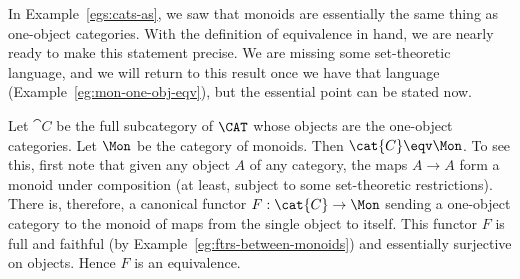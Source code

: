 \begin{example}
\label{eg:equivs-mon}
In Example~\ref{egs:cats-as}, we saw that monoids
are essentially the same thing as one-object%
%
%
categories.  With the definition of equivalence in hand, we are nearly
ready to make this statement precise.  We are missing some set-theoretic
language, and we will return to this result once we have that language
(Example~\ref{eg:mon-one-obj-eqv}), but the essential point can be stated
now.

Let $\cat{C}$ be the full subcategory of $\CAT$ whose objects are the
one-object categories.  Let $\Mon$ be the category of monoids.  Then
$\cat{C} \eqv \Mon$.  To see this, first note that given any object $A$ of
any category, the maps $A \to A$ form a monoid under composition (at least,
subject to some set-theoretic restrictions).  There is, therefore, a
canonical functor $F: \cat{C} \to \Mon$ sending a one-object category to
the monoid of maps from the single object to itself.  This functor $F$ is
full and faithful (by Example~\ref{eg:ftrs-between-monoids}) and
essentially surjective on objects.  Hence $F$ is an equivalence.
\end{example}

